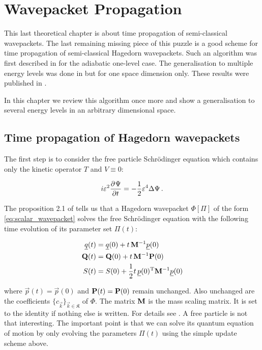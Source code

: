 \chapter{Wavepacket Propagation}
\label{ch:wavepacket_propagation}


This last theoretical chapter is about time propagation of semi-classical
wavepackets. The last remaining missing piece of this puzzle is a good scheme
for time propagation of semi-classical Hagedorn wavepackets. Such an algorithm was
first described in \cite{FGL_semiclassical_dynamics} for the adiabatic one-level
case. The generalisation to multiple energy levels was done in \cite{B_bachelor_thesis}
but for one space dimension only. These results were published in \cite{BGH_natac}.

In this chapter we review this algorithm once more and show a generalisation
to several energy levels in an arbitrary dimensional space.


\section{Time propagation of Hagedorn wavepackets}


The first step is to consider the free particle Schrödinger equation which
contains only the kinetic operator $T$ and $V \equiv 0$:

\begin{equation*}
  i \varepsilon^2  \frac{\partial^{}\Psi}{\partial t^{}} = -\frac{1}{2} \varepsilon^4 \Delta \Psi \,.
\end{equation*}

The proposition 2.1 of \cite{FGL_semiclassical_dynamics} tells us that a Hagedorn wavepacket
$\Phi[\Pi]$ of the form \eqref{eq:scalar_wavepacket} solves the free Schrödinger
equation with the following time evolution of its parameter set $\Pi(t)$:

\begin{equation} \label{eq:update_scheme_kin}
\begin{split}
  \underline{q}(t) & = \underline{q}(0) + t \, \mathbf{M}{}^{-1} \underline{p}(0) \\
  \mathbf{Q}(t) & = \mathbf{Q}(0) + t \, \mathbf{M}{}^{-1} \mathbf{P}(0) \\
  S(t) & = S(0) + \frac{1}{2}t \, \underline{p}(0){}^{\textnormal{T}} \mathbf{M}{}^{-1} \underline{p}(0)
\end{split}
\end{equation}

where $\vec{p}(t) = \vec{p}(0)$ and $\mathbf{P}(t) = \mathbf{P}(0)$ remain unchanged.
Also unchanged are the coefficients $\{c_{\vec{k}}\}_{\vec{k} \in \mathfrak{K}}$
of $\Phi$. The matrix $\mathbf{M}$ is the mass scaling matrix. It is set to the
identity if nothing else is written. For details see \cite[equation 2.8]{FGL_semiclassical_dynamics}.
A free particle is not that interesting. The important point is that we can
solve its quantum equation of motion by only evolving the parameters $\Pi(t)$
using the simple update scheme above.

